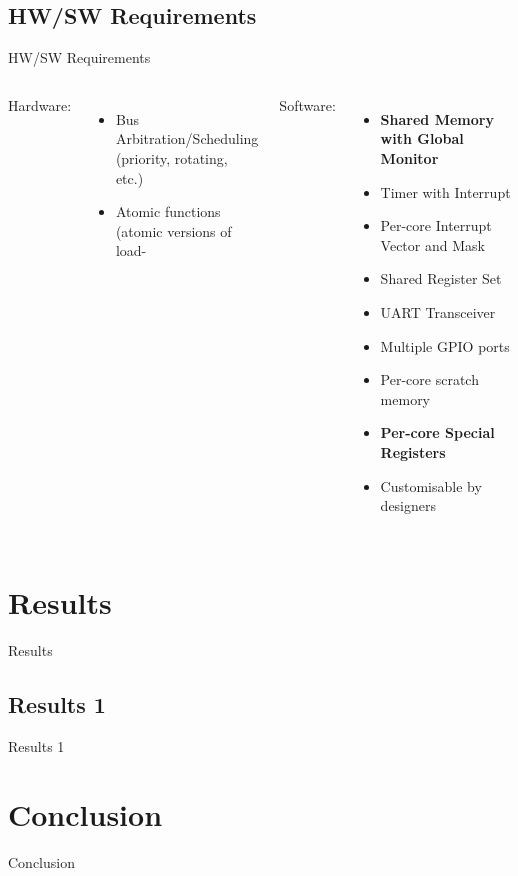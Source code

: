 \documentclass[aspectratio=169]{beamer}
\begin{document}
\subsection{HW/SW Requirements}
\begin{frame}{HW/SW Requirements}
\begin{columns}[t]
Hardware:
\begin{itemize}
    \item Bus Arbitration/Scheduling\\ (priority, rotating, etc.)
    \item Atomic functions\\ (atomic versions of load-
\end{itemize}
Software:
\begin{itemize}
    \item \textbf{Shared Memory with Global Monitor}
    \item Timer with Interrupt
    \item Per-core Interrupt Vector and Mask
    \item Shared Register Set
    \item UART Transceiver
    \item Multiple GPIO ports
    \item Per-core scratch memory
    \item \textbf{Per-core Special Registers}
    \item Customisable by designers
\end{itemize}
\end{columns}

\end{frame}

\section{Results}
\frame{\tableofcontents[currentsection, subsectionstyle=show/show/hide]}
\begin{frame}{Results}
\end{frame}
\subsection{Results 1}
\begin{frame}{Results 1}
\end{frame}

\section{Conclusion}
\frame{\tableofcontents[currentsection, subsectionstyle=show/show/hide]}
\begin{frame}{Conclusion}
\end{frame}
\end{document}

